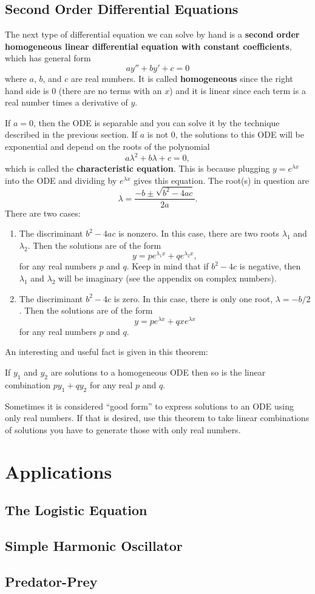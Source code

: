\subsection{Second Order Differential Equations}

The next type of differential equation we can solve by hand is a \textbf{second order homogeneous linear differential equation with constant coefficients}, which has general form
$$ay''+by'+c=0$$
where $a$, $b$, and $c$ are real numbers. It is called \textbf{homogeneous} since the right hand side is 0 (there are no terms with an $x$) and it is linear since each term is a real number times a derivative of $y$. 

If $a=0$, then the ODE is separable and you can solve it by the technique described in the previous section. If $a$ is not 0, the solutions to this ODE will be exponential and depend on the roots of the polynomial
$$a\lambda^2 + b\lambda + c = 0,$$
which is called the \textbf{characteristic equation}.
This is because plugging $y=e^{\lambda x}$ into the ODE and dividing by $e^{\lambda x}$ gives this equation.  The root(s) in question are
$$\lambda = \frac{-b \pm \sqrt{b^2-4ac}}{2a}.$$
 There are two cases:
\begin{enumerate}
\item The discriminant $b^2-4ac$ is nonzero. In this case, there are two roots $\lambda_1$ and $\lambda_2$. Then the solutions are of the form
$$y=pe^{\lambda_1 x} + qe^{\lambda_2 x},$$
for any real numbers $p$ and $q$. Keep in mind that if $b^2-4c$ is negative, then $\lambda_1$ and $\lambda_2$ will be imaginary (see the appendix on complex numbers). 
\item The discriminant $b^2-4c$ is zero. In this case, there is only one root, $\lambda = -b/2$. Then the solutions are of the form
$$y=pe^{\lambda x}+qxe^{\lambda x}$$
for any real numbers $p$ and $q$.
\end{enumerate}

An interesting and useful fact is given in this theorem:
\begin{thm}
If $y_1$ and $y_2$ are solutions to a homogeneous ODE then so is the linear combination $p{y_1}+q{y_2}$ for any real $p$ and $q$.
\end{thm}
 
Sometimes it is considered ``good form'' to express solutions to an ODE using only real numbers. If that is desired, use this theorem to take linear combinations of solutions you have to generate those with only real numbers.

\section{Applications}
\subsection{The Logistic Equation}
\subsection{Simple Harmonic Oscillator}
\subsection{Predator-Prey}
